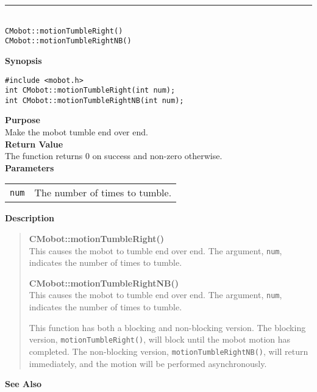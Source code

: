 \noindent
\vspace{5pt}
\rule{4.5in}{0.015in}\\
\noindent
{\LARGE \texttt{CMobot::motionTumbleRight()}}\\
{\LARGE \texttt{CMobot::motionTumbleRightNB()}}\\
{}

\noindent
{\bf Synopsis}
\vspace{-8pt}
\begin{verbatim}
#include <mobot.h>
int CMobot::motionTumbleRight(int num);
int CMobot::motionTumbleRightNB(int num);
\end{verbatim}

\noindent
{\bf Purpose}\\
Make the mobot tumble end over end.\\

\noindent
{\bf Return Value}\\
The function returns 0 on success and non-zero otherwise.\\

\noindent
{\bf Parameters}\\
\vspace{-0.1in}
\begin{description}
\item               
\begin{tabular}{p{10 mm}p{145 mm}}
\texttt{num} & The number of times to tumble. \\
\end{tabular}
\end{description}

\noindent
{\bf Description}\\
\vspace{-12pt}
\begin{quote}
{\bf CMobot::motionTumbleRight()}\\
This causes the mobot to tumble end over end. The argument, \texttt{num},
indicates the number of times to tumble.

{\bf CMobot::motionTumbleRightNB()}\\
This causes the mobot to tumble end over end. The argument, \texttt{num},
indicates the number of times to tumble.

This function has both a blocking and non-blocking version.
The blocking version, \texttt{motionTumbleRight()}, will block until the
mobot motion has completed. The non-blocking version, \texttt{motionTumbleRightNB()},
will return immediately, and the motion will be performed asynchronously.\\
\end{quote}

\noindent
{\bf See Also}\\

